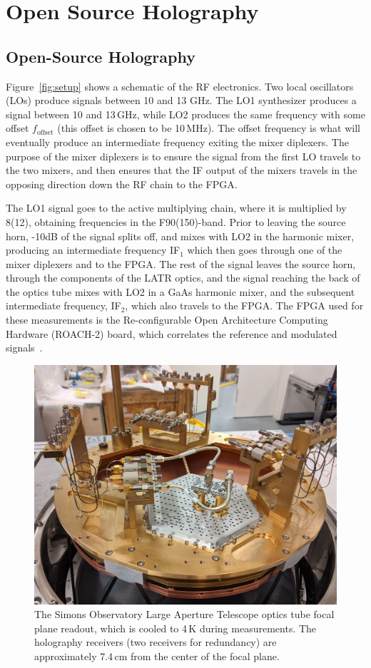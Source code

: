 \chapter{Open Source Holography} %
\label{app:holog}

\section{Open-Source Holography}
\label{sec:appendix_hardware}

Figure~\ref{fig:setup} shows a schematic of the RF electronics.  Two local oscillators (LOs) produce signals between 10 and 13 GHz. The LO1 synthesizer produces a signal between 10 and 13\,GHz, while LO2 produces the same frequency with some offset $f_{\text{offset}}$ (this offset is chosen to be 10\,MHz).  The offset frequency is what will eventually produce an intermediate frequency exiting the mixer diplexers.  The purpose of the mixer diplexers is to ensure the signal from the first LO travels to the two mixers, and then ensures that the IF output of the mixers travels in the opposing direction down the RF chain to the FPGA.

The LO1 signal goes to the active multiplying chain, where it is multiplied by 8(12), obtaining frequencies in the F90(150)-band.  Prior to leaving the source horn, -10dB of the signal splits off, and mixes with LO2 in the harmonic mixer, producing an intermediate frequency IF$_1$ which then goes through one of the mixer diplexers and to the FPGA.  The rest of the signal leaves the source horn, through the components of the LATR optics, and the signal reaching the back of the optics tube mixes with LO2 in a GaAs harmonic mixer, and the subsequent intermediate frequency, IF$_2$, which also travels to the FPGA.  The FPGA used for these measurements is the Re-configurable Open Architecture Computing Hardware (ROACH-2) board, which correlates the reference and modulated signals~\cite{roach2}.

\begin{figure}[ht]
    \centering
    \includegraphics[width = .7\textwidth]{Figures/FPA.jpeg}
    \caption{The Simons Observatory Large Aperture Telescope optics tube focal plane readout, which is cooled to 4\,K during measurements.  The holography receivers (two receivers for redundancy) are approximately 7.4\,cm from the center of the focal plane.}
    \label{fig:fpa}
\end{figure}

